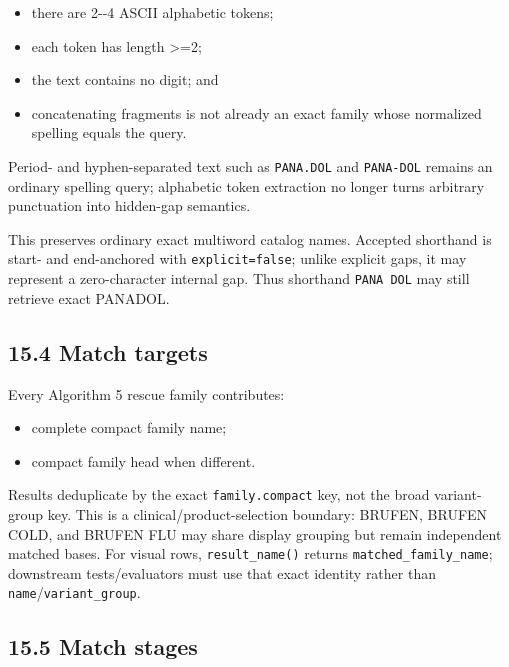 \begin{itemize}
\tightlist
\item
  there are 2-\/-4 ASCII alphabetic tokens;
\item
  each token has length \textgreater=2;
\item
  the text contains no digit; and
\item
  concatenating fragments is not already an exact family whose normalized spelling equals the query.
\end{itemize}

Period- and hyphen-separated text such as \texttt{PANA.DOL} and \texttt{PANA-DOL} remains an
ordinary spelling query; alphabetic token extraction no longer turns arbitrary
punctuation into hidden-gap semantics.

This preserves ordinary exact multiword catalog names. Accepted shorthand is start- and end-anchored with \texttt{explicit=false}; unlike explicit gaps, it may represent a zero-character internal gap. Thus shorthand \texttt{PANA\ DOL} may still retrieve exact PANADOL.

\subsection{15.4 Match targets}\label{154-match-targets}

Every Algorithm 5 rescue family contributes:

\begin{itemize}
\tightlist
\item
  complete compact family name;
\item
  compact family head when different.
\end{itemize}

Results deduplicate by the exact \texttt{family.compact} key, not the broad variant-group key. This is a clinical/product-selection boundary: BRUFEN, BRUFEN COLD, and BRUFEN FLU may share display grouping but remain independent matched bases. For visual rows, \texttt{result\_\allowbreak{}name()} returns \texttt{matched\_\allowbreak{}family\_\allowbreak{}name}; downstream tests/evaluators must use that exact identity rather than \texttt{name}/\texttt{variant\_\allowbreak{}group}.

\subsection{15.5 Match stages}\label{155-match-stages}

